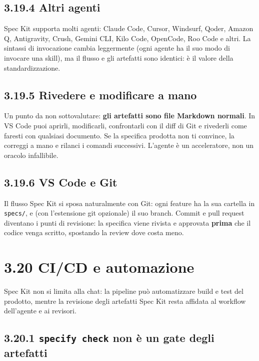 \documentclass[
  italian,
  10pt,
]{book}
\begin{document}
\subsection{3.19.4 Altri agenti}\label{altri-agenti}

Spec Kit supporta molti agenti: Claude Code, Cursor, Windsurf, Qoder,
Amazon Q, Antigravity, Crush, Gemini CLI, Kilo Code, OpenCode, Roo Code
e altri. La sintassi di invocazione cambia leggermente (ogni agente ha
il suo modo di invocare una skill), ma il flusso e gli artefatti sono
identici: è il valore della standardizzazione.

\subsection{3.19.5 Rivedere e modificare a
mano}\label{rivedere-e-modificare-a-mano}

Un punto da non sottovalutare: \textbf{gli artefatti sono file Markdown
normali}. In VS Code puoi aprirli, modificarli, confrontarli con il diff
di Git e rivederli come faresti con qualsiasi documento. Se la specifica
prodotta non ti convince, la correggi a mano e rilanci i comandi
successivi. L'agente è un acceleratore, non un oracolo infallibile.

\subsection{3.19.6 VS Code e Git}\label{vs-code-e-git}

Il flusso Spec Kit si sposa naturalmente con Git: ogni feature ha la sua
cartella in \texttt{specs/}, e (con l'estensione git opzionale) il suo
branch. Commit e pull request diventano i punti di revisione: la
specifica viene rivista e approvata \textbf{prima} che il codice venga
scritto, spostando la review dove costa meno.

\section{3.20 CI/CD e automazione}\label{cicd-e-automazione}

Spec Kit non si limita alla chat: la pipeline può automatizzare build e
test del prodotto, mentre la revisione degli artefatti Spec Kit resta
affidata al workflow dell'agente e ai revisori.

\subsection{\texorpdfstring{3.20.1 \texttt{specify\ check} non è un gate
degli
artefatti}{3.20.1 specify check non è un gate degli artefatti}}\label{specify-check-non-uxe8-un-gate-degli-artefatti}
\end{document}
